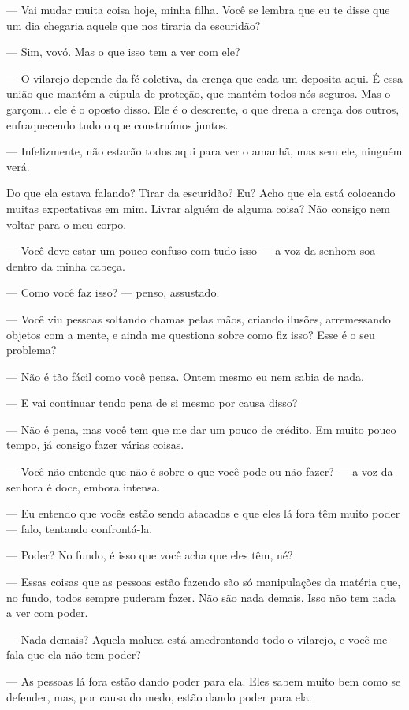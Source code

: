 — Vai mudar muita coisa hoje, minha filha. Você se lembra que eu te disse que um dia chegaria aquele que nos tiraria da escuridão?

— Sim, vovó. Mas o que isso tem a ver com ele?

— O vilarejo depende da fé coletiva, da crença que cada um deposita aqui.  
É essa união que mantém a cúpula de proteção, que mantém todos nós seguros.  
Mas o garçom... ele é o oposto disso.  
Ele é o descrente, o que drena a crença dos outros, enfraquecendo tudo o que construímos juntos.

— Infelizmente, não estarão todos aqui para ver o amanhã, mas sem ele, ninguém verá.

Do que ela estava falando? Tirar da escuridão? Eu?  
Acho que ela está colocando muitas expectativas em mim.  
Livrar alguém de alguma coisa?  
Não consigo nem voltar para o meu corpo.

— Você deve estar um pouco confuso com tudo isso — a voz da senhora soa dentro da minha cabeça.

— Como você faz isso? — penso, assustado.

— Você viu pessoas soltando chamas pelas mãos, criando ilusões, arremessando objetos com a mente, e ainda me questiona sobre como fiz isso?  
Esse é o seu problema?

— Não é tão fácil como você pensa. Ontem mesmo eu nem sabia de nada.

— E vai continuar tendo pena de si mesmo por causa disso?

— Não é pena, mas você tem que me dar um pouco de crédito.  
Em muito pouco tempo, já consigo fazer várias coisas.

— Você não entende que não é sobre o que você pode ou não fazer? — a voz da senhora é doce, embora intensa.

— Eu entendo que vocês estão sendo atacados e que eles lá fora têm muito poder — falo, tentando confrontá-la.

— Poder? No fundo, é isso que você acha que eles têm, né?

— Essas coisas que as pessoas estão fazendo são só manipulações da matéria que, no fundo, todos sempre puderam fazer.  
Não são nada demais.  
Isso não tem nada a ver com poder.

— Nada demais? Aquela maluca está amedrontando todo o vilarejo, e você me fala que ela não tem poder?

— As pessoas lá fora estão dando poder para ela.  
Eles sabem muito bem como se defender, mas, por causa do medo, estão dando poder para ela.


